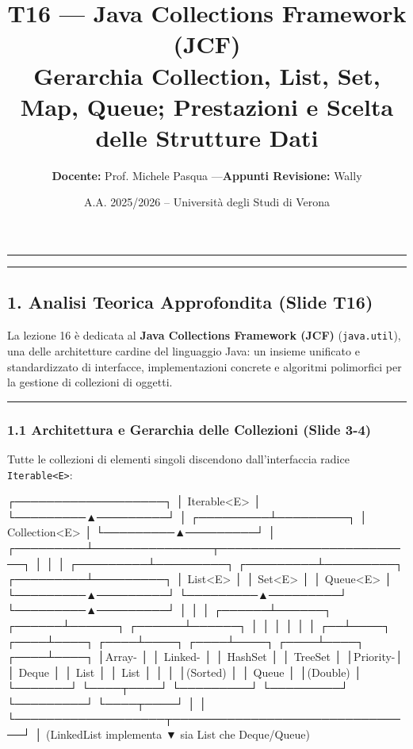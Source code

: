 \documentclass[11pt,a4paper]{article}
\title{\Huge\bfseries\sffamily\color{brandblue} T16 --- Java Collections Framework (JCF) \\[0.3em] \large\sffamily Gerarchia Collection, List, Set, Map, Queue; Prestazioni e Scelta delle Strutture Dati}
\author{\textbf{Docente:} Prof. Michele Pasqua \quad---\quad \textbf{Appunti Revisione:} Wally}
\date{A.A. 2025/2026 -- Universit\`a degli Studi di Verona}
\newcommand{\passthrough}[1]{#1}
\begin{document}
\maketitle
\thispagestyle{fancy}
\vspace{-1.2em}
\noindent\textcolor{brandblue}{\rule{\textwidth}{0.8pt}}
\vspace{1.2em}

\begin{center}\rule{0.5\linewidth}{0.5pt}\end{center}

\subsection{1. Analisi Teorica Approfondita (Slide
T16)}\label{analisi-teorica-approfondita-slide-t16}

La lezione 16 è dedicata al \textbf{Java Collections Framework (JCF)}
(\passthrough{\lstinline!java.util!}), una delle architetture cardine
del linguaggio Java: un insieme unificato e standardizzato di
interfacce, implementazioni concrete e algoritmi polimorfici per la
gestione di collezioni di oggetti.

\begin{center}\rule{0.5\linewidth}{0.5pt}\end{center}

\subsubsection{1.1 Architettura e Gerarchia delle Collezioni (Slide
3-4)}\label{architettura-e-gerarchia-delle-collezioni-slide-3-4}

Tutte le collezioni di elementi singoli discendono dall'interfaccia
radice \passthrough{\lstinline!Iterable<E>!}:

\needspace{7cm}
\begin{asciibox}
┌───────────────────┐
│    Iterable<E>    │
└─────────▲─────────┘
          │
┌─────────┴─────────┐
│   Collection<E>   │
└─────────▲─────────┘
          │
┌─────────┴───────────────┬─────────────────────────┐
│                         │                         │
┌─────────┴─────────┐     ┌─────────┴─────────┐     ┌─────────┴─────────┐
│      List<E>      │     │      Set<E>       │     │     Queue<E>      │
└─────────▲─────────┘     └─────────▲─────────┘     └─────────▲─────────┘
          │                         │                         │
   ┌──────┴──────┐           ┌──────┴──────┐           ┌──────┴──────┐
   │             │           │             │           │             │
┌──┴────┐   ┌────┴────┐ ┌────┴────┐   ┌────┴────┐ ┌────┴────┐   ┌────┴────┐
│Array- │   │ Linked- │ │ HashSet │   │ TreeSet │ │Priority-│   │  Deque  │
│ List  │   │  List   │ │         │   │(Sorted) │ │  Queue  │   │(Double) │
└───────┘   └────┬────┘ └─────────┘   └─────────┘ └─────────┘   └────┬────┘
                 │                                                   │
                 └───────────────────┬───────────────────────────────┘
                                     │ (LinkedList implementa
                                     ▼  sia List che Deque/Queue)
\end{asciibox}
\end{document}
